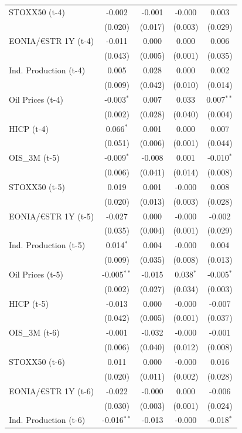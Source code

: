 \begin{longtable}[t]{lcccc}
STOXX50 (t-4) & -0.002 & -0.001 & -0.000 & 0.003\\
 & (0.020) & (0.017) & (0.003) & (0.029)\\
EONIA/€STR 1Y (t-4) & -0.011 & 0.000 & 0.000 & 0.006\\
 & (0.043) & (0.005) & (0.001) & (0.035)\\
Ind. Production (t-4) & 0.005 & 0.028 & 0.000 & 0.002\\
 & (0.009) & (0.042) & (0.010) & (0.014)\\
Oil Prices (t-4) & -0.003$^{*}$ & 0.007 & 0.033 & 0.007$^{**}$\\
 & (0.002) & (0.028) & (0.040) & (0.004)\\
HICP (t-4) & 0.066$^{*}$ & 0.001 & 0.000 & 0.007\\
 & (0.051) & (0.006) & (0.001) & (0.044)\\
OIS\_3M (t-5) & -0.009$^{*}$ & -0.008 & 0.001 & -0.010$^{*}$\\
 & (0.006) & (0.041) & (0.014) & (0.008)\\
STOXX50 (t-5) & 0.019 & 0.001 & -0.000 & 0.008\\
 & (0.020) & (0.013) & (0.003) & (0.028)\\
EONIA/€STR 1Y (t-5) & -0.027 & 0.000 & -0.000 & -0.002\\
 & (0.035) & (0.004) & (0.001) & (0.029)\\
Ind. Production (t-5) & 0.014$^{*}$ & 0.004 & -0.000 & 0.004\\
 & (0.009) & (0.035) & (0.008) & (0.013)\\
Oil Prices (t-5) & -0.005$^{**}$ & -0.015 & 0.038$^{*}$ & -0.005$^{*}$\\
 & (0.002) & (0.027) & (0.034) & (0.003)\\
HICP (t-5) & -0.013 & 0.000 & -0.000 & -0.007\\
 & (0.042) & (0.005) & (0.001) & (0.037)\\
OIS\_3M (t-6) & -0.001 & -0.032 & -0.000 & -0.001\\
 & (0.006) & (0.040) & (0.012) & (0.008)\\
STOXX50 (t-6) & 0.011 & 0.000 & -0.000 & 0.016\\
 & (0.020) & (0.011) & (0.002) & (0.028)\\
EONIA/€STR 1Y (t-6) & -0.022 & -0.000 & 0.000 & -0.006\\
 & (0.030) & (0.003) & (0.001) & (0.024)\\
Ind. Production (t-6) & -0.016$^{**}$ & -0.013 & -0.000 & -0.018$^{*}$\\

\end{longtable}
